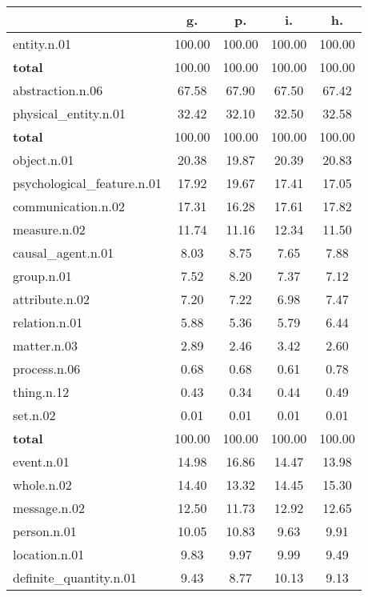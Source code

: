 \begin{table}[h!]
\begin{center}
\begin{tabular}{| l || c | c | c | c |}\hline
 & {\bf g.} & {\bf p.} & {\bf i.} & {\bf h.} \\\hline\hline
entity.n.01 & 100.00  & 100.00  & 100.00  & 100.00 \\\hline\hline
{{\bf total}} & 100.00  & 100.00  & 100.00  & 100.00 \\\hline\hline\hline
abstraction.n.06 & 67.58  & 67.90  & 67.50  & 67.42 \\\hline
physical\_entity.n.01 & 32.42  & 32.10  & 32.50  & 32.58 \\\hline\hline
{{\bf total}} & 100.00  & 100.00  & 100.00  & 100.00 \\\hline\hline\hline
object.n.01 & 20.38  & 19.87  & 20.39  & 20.83 \\\hline
psychological\_feature.n.01 & 17.92  & 19.67  & 17.41  & 17.05 \\\hline
communication.n.02 & 17.31  & 16.28  & 17.61  & 17.82 \\\hline
measure.n.02 & 11.74  & 11.16  & 12.34  & 11.50 \\\hline
causal\_agent.n.01 & 8.03  & 8.75  & 7.65  & 7.88 \\\hline
group.n.01 & 7.52  & 8.20  & 7.37  & 7.12 \\\hline
attribute.n.02 & 7.20  & 7.22  & 6.98  & 7.47 \\\hline
relation.n.01 & 5.88  & 5.36  & 5.79  & 6.44 \\\hline
matter.n.03 & 2.89  & 2.46  & 3.42  & 2.60 \\\hline
process.n.06 & 0.68  & 0.68  & 0.61  & 0.78 \\\hline
thing.n.12 & 0.43  & 0.34  & 0.44  & 0.49 \\\hline
set.n.02 & 0.01  & 0.01  & 0.01  & 0.01 \\\hline\hline
{{\bf total}} & 100.00  & 100.00  & 100.00  & 100.00 \\\hline\hline\hline
event.n.01 & 14.98  & 16.86  & 14.47  & 13.98 \\\hline
whole.n.02 & 14.40  & 13.32  & 14.45  & 15.30 \\\hline
message.n.02 & 12.50  & 11.73  & 12.92  & 12.65 \\\hline
person.n.01 & 10.05  & 10.83  & 9.63  & 9.91 \\\hline
location.n.01 & 9.83  & 9.97  & 9.99  & 9.49 \\\hline
definite\_quantity.n.01 & 9.43  & 8.77  & 10.13  & 9.13 \\\hline

\end{tabular}
\end{center}
\end{table}
